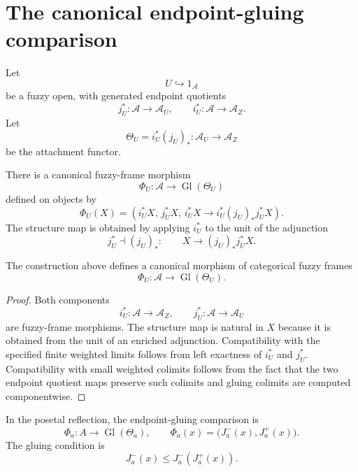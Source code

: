 \section{The canonical endpoint-gluing comparison}
\label{sec:canonical-endpoint-gluing-comparison}

Let
\[
    U\hookrightarrow1_{\mathcal A}
\]
be a fuzzy open, with generated endpoint quotients
\[
    j_U^\ast:\mathcal A\to\mathcal A_U,
    \qquad
    i_U^\ast:\mathcal A\to\mathcal A_Z.
\]
Let
\[
    \Theta_U=i_U^\ast(j_U)_\ast:
    \mathcal A_U\to\mathcal A_Z
\]
be the attachment functor.

\begin{construction}
\label{con:endpoint-gluing-comparison}
There is a canonical fuzzy-frame morphism
\[
    \Phi_U:\mathcal A\to\operatorname{Gl}(\Theta_U)
\]
defined on objects by
\[
    \Phi_U(X)
    =
    \left(
        i_U^\ast X,\,
        j_U^\ast X,\,
        i_U^\ast X\to i_U^\ast(j_U)_\ast j_U^\ast X
    \right).
\]
The structure map is obtained by applying \(i_U^\ast\) to the unit of the
adjunction
\[
    j_U^\ast\dashv(j_U)_\ast:
    \qquad
    X\to(j_U)_\ast j_U^\ast X.
\]
\end{construction}

\begin{proposition}
\label{prop:endpoint-gluing-comparison-canonical}
The construction above defines a canonical morphism of categorical fuzzy
frames
\[
    \Phi_U:\mathcal A\to\operatorname{Gl}(\Theta_U).
\]
\end{proposition}

\begin{proof}
Both components
\[
    i_U^\ast:\mathcal A\to\mathcal A_Z,
    \qquad
    j_U^\ast:\mathcal A\to\mathcal A_U
\]
are fuzzy-frame morphisms.  The structure map is natural in \(X\) because it is
obtained from the unit of an enriched adjunction.  Compatibility with the
specified finite weighted limits follows from left exactness of \(i_U^\ast\) and
\(j_U^\ast\).  Compatibility with small weighted colimits follows from the
fact that the two endpoint quotient maps preserve such colimits and gluing
colimits are computed componentwise.
\end{proof}

\begin{proposition}
\label{prop:posetal-endpoint-gluing-comparison}
In the posetal reflection, the endpoint-gluing comparison is
\[
    \Phi_a:A\to\operatorname{Gl}(\Theta_a),
    \qquad
    \Phi_a(x)=\bigl(J_a^-(x),J_a^+(x)\bigr).
\]
The gluing condition is
\[
    J_a^-(x)\leq J_a^-(J_a^+(x)).
\]
\end{proposition}

